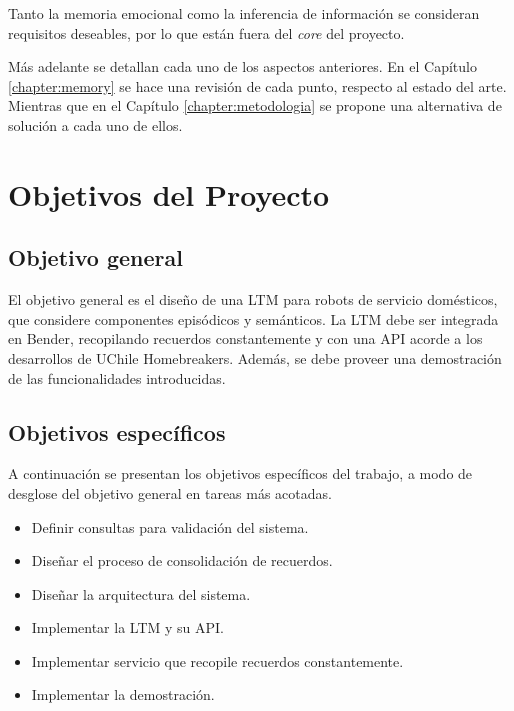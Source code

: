 Tanto la memoria emocional como la inferencia de información se consideran requisitos deseables, por lo que están fuera del \textit{core} del proyecto.

Más adelante se detallan cada uno de los aspectos anteriores. En el Capítulo \ref{chapter:memory} se hace una revisión de cada punto, respecto al estado del arte. Mientras que en el Capítulo \ref{chapter:metodologia} se propone una alternativa de solución a cada uno de ellos.




\section{Objetivos del Proyecto}

\subsection{Objetivo general}
El objetivo general es el diseño de una LTM para robots de servicio domésticos, que considere componentes episódicos y semánticos. La LTM debe ser integrada en Bender, recopilando recuerdos constantemente y con una API acorde a los desarrollos de UChile Homebreakers. Además, se debe proveer una demostración de las funcionalidades introducidas.


\subsection{Objetivos específicos}
A continuación se presentan los objetivos específicos del trabajo, a modo de desglose del objetivo general en tareas más acotadas.

\begin{itemize}
	\item Definir consultas para validación del sistema.
	\item Diseñar el proceso de consolidación de recuerdos.
	\item Diseñar la arquitectura del sistema.
	\item Implementar la LTM y su API.
	\item Implementar servicio que recopile recuerdos constantemente.
	\item Implementar la demostración.
\end{itemize}


